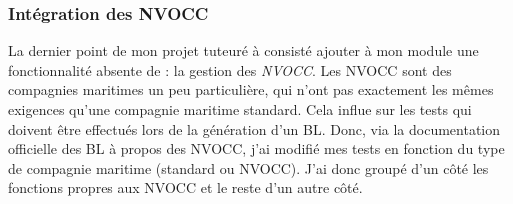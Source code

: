 \subsubsection{Intégration des NVOCC}
La dernier point de mon projet tuteuré à consisté ajouter à mon module une fonctionnalité absente de \pireus{} : la gestion des \emph{NVOCC}. Les NVOCC sont des compagnies maritimes un peu particulière, qui n'ont pas exactement les mêmes exigences qu'une compagnie maritime standard. Cela influe sur les tests qui doivent être effectués lors de la génération d'un BL. Donc, via la documentation officielle des BL à propos des NVOCC, j'ai modifié mes tests en fonction du type de compagnie maritime (standard ou NVOCC). J'ai donc groupé d'un côté les fonctions propres aux NVOCC et le reste d'un autre côté.
